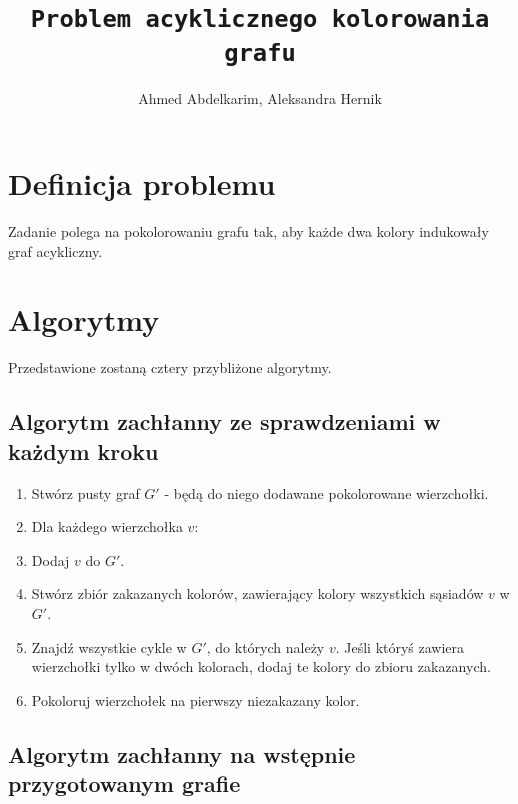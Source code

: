\documentclass{article}
\title{\texttt{Problem acyklicznego kolorowania grafu}}
\author{Ahmed Abdelkarim, Aleksandra Hernik}
\begin{document}
\maketitle
\section{Definicja problemu}
Zadanie polega na pokolorowaniu grafu tak, aby każde dwa kolory indukowały graf acykliczny. 
\section{Algorytmy}
Przedstawione zostaną cztery przybliżone algorytmy.
\subsection{Algorytm zachłanny ze sprawdzeniami w każdym kroku}
\begin{enumerate}
\item Stwórz pusty graf $G'$ - będą do niego dodawane pokolorowane wierzchołki.
\item Dla każdego wierzchołka $v$:
\item Dodaj $v$ do $G'$.
\item Stwórz zbiór zakazanych kolorów, zawierający kolory wszystkich sąsiadów $v$ w $G'$.
\item Znajdź wszystkie cykle w $G'$, do których należy $v$. Jeśli któryś zawiera wierzchołki tylko w dwóch kolorach, dodaj te kolory do zbioru zakazanych.
\item Pokoloruj wierzchołek na pierwszy niezakazany kolor.
  
\end{enumerate}
\subsection{Algorytm zachłanny na wstępnie przygotowanym grafie}
\end{document}
